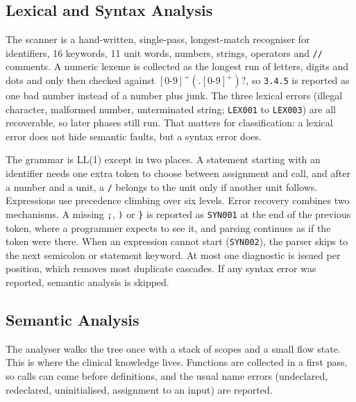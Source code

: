 \documentclass[12pt,a4paper]{article}
\newcommand{\code}[1]{\texttt{#1}}
\begin{document}
\subsection{Lexical and Syntax Analysis}

The scanner is a hand-written, single-pass, longest-match recogniser for identifiers, 16 keywords, 11 unit words,
numbers, strings, operators and \code{//} comments. A numeric lexeme is collected as the longest run of letters, digits
and dots and only then checked against $[0\text{-}9]^+(.[0\text{-}9]^+)?$, so \code{3.4.5} is reported as one bad
number instead of a number plus junk. The three lexical errors (illegal character, malformed number, unterminated
string; \code{LEX001} to \code{LEX003}) are all recoverable, so later phases still run. That matters for
classification: a lexical error does not hide semantic faults, but a syntax error does.

The grammar is LL(1) except in two places. A statement starting with an identifier needs one extra token to choose
between assignment and call, and after a number and a unit, a \code{/} belongs to the unit only if another unit follows.
Expressions use precedence climbing over six levels. Error recovery combines two mechanisms. A missing \code{;},
\code{)} or \code{\}} is reported as \code{SYN001} at the end of the previous token, where a programmer expects to see
it, and parsing continues as if the token were there. When an expression cannot start (\code{SYN002}), the parser skips
to the next semicolon or statement keyword. At most one diagnostic is issued per position, which removes most duplicate
cascades. If any syntax error was reported, semantic analysis is skipped.

\subsection{Semantic Analysis}

The analyser walks the tree once with a stack of scopes and a small flow state. This is where the clinical knowledge
lives. Functions are collected in a first pass, so calls can come before definitions, and the usual name errors
(undeclared, redeclared, uninitialised, assignment to an input) are reported.
\end{document}

